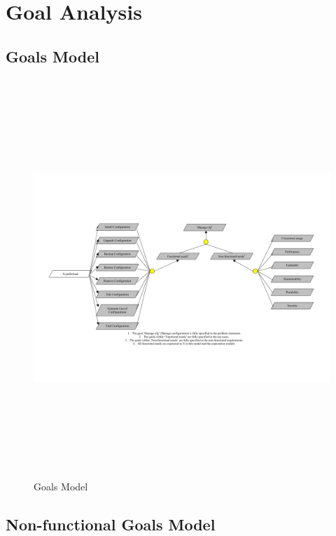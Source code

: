\newpage
\section{Goal Analysis}

\subsection{Goals Model}

\begin{figure}[htbp]
  \centering
  \includegraphics[angle=90,width=15cm,height=15cm]{"Goalsmodel"}
  \caption{Goals Model}
  \label{fig:goalmodel}
\end{figure}

\newpage
\subsection{Non-functional Goals Model}

